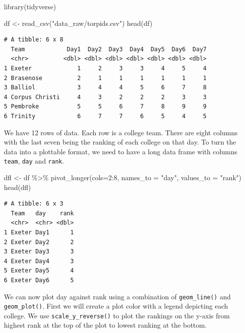 \documentclass[
  letterpaper,
  DIV=11,
  numbers=noendperiod]{scrreprt}
\newenvironment{Shaded}{\begin{snugshade}}{\end{snugshade}}
\newcommand{\AttributeTok}[1]{\textcolor[rgb]{0.40,0.45,0.13}{#1}}
\newcommand{\DecValTok}[1]{\textcolor[rgb]{0.68,0.00,0.00}{#1}}
\newcommand{\FunctionTok}[1]{\textcolor[rgb]{0.28,0.35,0.67}{#1}}
\newcommand{\NormalTok}[1]{\textcolor[rgb]{0.00,0.23,0.31}{#1}}
\newcommand{\OtherTok}[1]{\textcolor[rgb]{0.00,0.23,0.31}{#1}}
\newcommand{\SpecialCharTok}[1]{\textcolor[rgb]{0.37,0.37,0.37}{#1}}
\newcommand{\StringTok}[1]{\textcolor[rgb]{0.13,0.47,0.30}{#1}}
\begin{document}
\begin{Shaded}
\begin{Highlighting}[]
\FunctionTok{library}\NormalTok{(tidyverse)}

\NormalTok{df }\OtherTok{\textless{}{-}} \FunctionTok{read\_csv}\NormalTok{(}\StringTok{"data\_raw/torpids.csv"}\NormalTok{)}
\FunctionTok{head}\NormalTok{(df)}
\end{Highlighting}
\end{Shaded}

\begin{verbatim}
# A tibble: 6 x 8
  Team            Day1  Day2  Day3  Day4  Day5  Day6  Day7
  <chr>          <dbl> <dbl> <dbl> <dbl> <dbl> <dbl> <dbl>
1 Exeter             1     2     3     3     4     5     4
2 Brasenose          2     1     1     1     1     1     1
3 Balliol            3     4     4     5     6     7     8
4 Corpus Christi     4     3     2     2     2     3     3
5 Pembroke           5     5     6     7     8     9     9
6 Trinity            6     7     7     6     5     4     5
\end{verbatim}

We have 12 rows of data. Each row is a college team. There are eight
columns with the last seven being the ranking of each college on that
day. To turn the data into a plottable format, we need to have a long
data frame with columns \texttt{team}, \texttt{day} and \texttt{rank}.

\begin{Shaded}
\begin{Highlighting}[]
\NormalTok{dfl }\OtherTok{\textless{}{-}}\NormalTok{ df }\SpecialCharTok{\%\textgreater{}\%}
  \FunctionTok{pivot\_longer}\NormalTok{(}\AttributeTok{cols=}\DecValTok{2}\SpecialCharTok{:}\DecValTok{8}\NormalTok{, }\AttributeTok{names\_to =} \StringTok{"day"}\NormalTok{, }\AttributeTok{values\_to =} \StringTok{"rank"}\NormalTok{)}
\FunctionTok{head}\NormalTok{(dfl)}
\end{Highlighting}
\end{Shaded}

\begin{verbatim}
# A tibble: 6 x 3
  Team   day    rank
  <chr>  <chr> <dbl>
1 Exeter Day1      1
2 Exeter Day2      2
3 Exeter Day3      3
4 Exeter Day4      3
5 Exeter Day5      4
6 Exeter Day6      5
\end{verbatim}

We can now plot day against rank using a combination of
\texttt{geom\_line()} and \texttt{geom\_plot()}. First we will create a
plot color with a legend depicting each college. We use
\texttt{scale\_y\_reverse()} to plot the rankings on the y-axis from
highest rank at the top of the plot to lowest ranking at the bottom.
\end{document}
